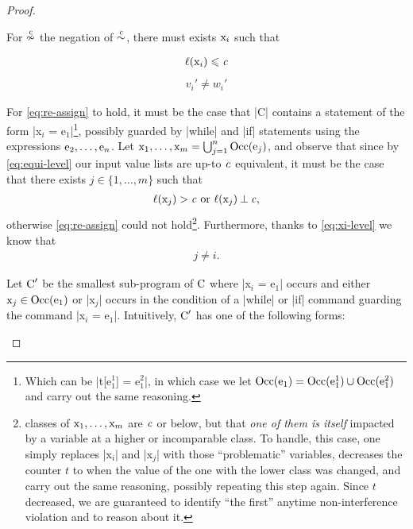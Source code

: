 \begin{proof}
\begin{description}
For \(\nupce{\scl{c}}\) the negation of \(\upce{\scl{c}}\),
\ie there must exists \(\prc|x$_i$|\) such that
\begin{multicols}{2}
\noindent
\begin{align}
\ell(\prc|x$_i$|) \leqslant \scl{c} \label{eq:xi-level}
\end{align}
\begin{align}
v_i' \neq w_i' \label{eq:re-assign}
\end{align}
\end{multicols}
For \autoref{eq:re-assign} to hold, it must be the case that \prc|C| contains a
statement of the form \prc|x$_i$ = e$_1$|\footnote{Which can be \prc|t[e$_1^1$]
= e$_1^2$|, in which case we let \(\Occ(\prc|e$_1$|) = \Occ(\prc|e$_1^1$|) \cup
\Occ(\prc|e$_1^2$|)\) and carry out the same reasoning.}, possibly guarded by
\prc|while| and \prc|if| statements using the expressions \(\prc|e$_2$|, \hdots,
\prc|e$_n$|\). Let \(\prc|x$_1$|, \hdots, \prc|x$_m$| = \bigcup_{j=1}^n
\Occ(\prc|e$_j$|)\), and observe that since by  \autoref{eq:equi-level} our
input value lists are up-to \(\mathit{c}\) equivalent, it must be the case that
there exists \(j \in \{1, \hdots, m\}\) such that
\begin{align}
\ell(\prc|x$_j$|) > \scl{c} \text{ or } \ell(\prc|x$_j$|) \orth \scl{c}
\text{,}	\label{eq:xj-level} \end{align}otherwise \autoref{eq:re-assign}
could not hold\footnote{%
classes of \(\prc|x$_1$|, \hdots, \prc|x$_m$|\) are $\mathit{c}$ or below, but that
\emph{one of them is itself} impacted by a variable at a higher or incomparable
class. To handle, this case, one simply replaces \prc|x$_i$| and \prc|x$_j$|
with those \enquote{problematic} variables, decreases the counter \(t\) to when
the value of the one with the lower class was changed, and carry out the same
reasoning, possibly repeating this step again. Since \(t\) decreased, we are
guaranteed to identify \enquote{the first} anytime non-interference violation
and to reason about it.}. Furthermore, thanks to \autoref{eq:xi-level} we know
that
\begin{align}
j \neq i\text{.} \label{eq:i-not-j}
\end{align}

Let \(\prc|C|'\) be the smallest sub-program of \(\prc|C|\) where \prc|x$_i$ =
e$_1$| occurs and either \(\prc|x$_j$| \in \Occ(\prc|e$_1$|)\) or \prc|x$_j$|
occurs in the condition of a \prc|while| or \prc|if| command guarding the
command \prc|x$_i$ = e$_1$|. Intuitively, \(\prc|C|'\) has one of the following
forms:
\vspace{.25em}


\end{description}
\end{proof}
